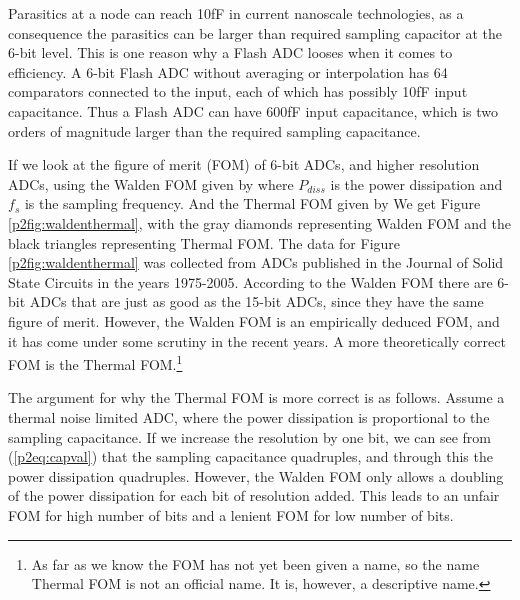 
Parasitics at a node can reach 10fF in current nanoscale
technologies, as a consequence the parasitics can be larger than required
sampling capacitor at the 6-bit level. This is
one reason why a Flash ADC looses when it comes to
efficiency. A 6-bit Flash ADC without averaging or interpolation has 64 comparators connected
to the input, each of which has possibly 10fF input capacitance. Thus
a Flash ADC can have 600fF input capacitance, which is two orders of magnitude larger than the
required sampling capacitance. 

If we look at the figure of merit (FOM) of 6-bit ADCs, and higher
resolution ADCs, using the Walden FOM \cite{walden99} given by
where $P_{diss}$ is the
power dissipation and $f_s$ is the sampling frequency. And the Thermal
FOM given by 
We get  Figure \ref{p2fig:waldenthermal}, with the gray
diamonds representing Walden FOM and the black triangles representing
Thermal FOM. The data for Figure
\ref{p2fig:waldenthermal} was collected from ADCs published in the Journal of
Solid State Circuits in the years 1975-2005. According to the Walden FOM there
are 6-bit ADCs that are just as good as the 15-bit ADCs, since they
have the same figure of merit. However, the Walden FOM is an
empirically deduced FOM, and it has come
under some scrutiny in the recent years. A more theoretically
correct FOM is the Thermal FOM.\footnote{As far as we
  know the FOM has not yet been given a name, so the name Thermal FOM
  is not an official name. It is, however, a descriptive name.}


The argument for why the Thermal FOM is more correct is as follows. Assume a thermal noise limited ADC, where
the power dissipation is proportional to the sampling
capacitance. 
If we increase the resolution by one bit, we can see from
(\ref{p2eq:capval}) that the sampling capacitance quadruples, and
through this the power dissipation quadruples.
However, the Walden FOM only allows a doubling of the
power dissipation for each bit of resolution added. This leads to an
unfair FOM for high number of bits and a lenient FOM for low
number of bits. 

